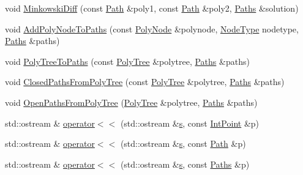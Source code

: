\begin{DoxyCompactItemize}
\item 
void \mbox{\hyperlink{namespace_clipper_lib_a76dac24102863220c7bc13be222a1dda}{Minkowski\+Diff}} (const \mbox{\hyperlink{namespace_clipper_lib_af39c8fe00f278f18cc8142fef41242da}{Path}} \&poly1, const \mbox{\hyperlink{namespace_clipper_lib_af39c8fe00f278f18cc8142fef41242da}{Path}} \&poly2, \mbox{\hyperlink{namespace_clipper_lib_a4bab1d9e10805fa6f1fd3b78c56efcfe}{Paths}} \&solution)
\item 
void \mbox{\hyperlink{namespace_clipper_lib_a4644758856e780ca359c3e37065397a6}{Add\+Poly\+Node\+To\+Paths}} (const \mbox{\hyperlink{class_clipper_lib_1_1_poly_node}{Poly\+Node}} \&polynode, \mbox{\hyperlink{namespace_clipper_lib_a31e9eef1fdd14cee54118420090b61d3}{Node\+Type}} nodetype, \mbox{\hyperlink{namespace_clipper_lib_a4bab1d9e10805fa6f1fd3b78c56efcfe}{Paths}} \&paths)
\item 
void \mbox{\hyperlink{namespace_clipper_lib_a3713b024b773e4e041f3de4595ff0f77}{Poly\+Tree\+To\+Paths}} (const \mbox{\hyperlink{class_clipper_lib_1_1_poly_tree}{Poly\+Tree}} \&polytree, \mbox{\hyperlink{namespace_clipper_lib_a4bab1d9e10805fa6f1fd3b78c56efcfe}{Paths}} \&paths)
\item 
void \mbox{\hyperlink{namespace_clipper_lib_a83f3a341799f94dd6bd9649b319d85fa}{Closed\+Paths\+From\+Poly\+Tree}} (const \mbox{\hyperlink{class_clipper_lib_1_1_poly_tree}{Poly\+Tree}} \&polytree, \mbox{\hyperlink{namespace_clipper_lib_a4bab1d9e10805fa6f1fd3b78c56efcfe}{Paths}} \&paths)
\item 
void \mbox{\hyperlink{namespace_clipper_lib_aa8b0b36c4c1e8108f39b10e4fba81cc5}{Open\+Paths\+From\+Poly\+Tree}} (\mbox{\hyperlink{class_clipper_lib_1_1_poly_tree}{Poly\+Tree}} \&polytree, \mbox{\hyperlink{namespace_clipper_lib_a4bab1d9e10805fa6f1fd3b78c56efcfe}{Paths}} \&paths)
\item 
std\+::ostream \& \mbox{\hyperlink{namespace_clipper_lib_a2e9613a92f21ac827d5b7f8b5ade5795}{operator$<$$<$}} (std\+::ostream \&\mbox{\hyperlink{detection_8cc_a9090f9756293390c57567a0bf7630abf}{s}}, const \mbox{\hyperlink{struct_clipper_lib_1_1_int_point}{Int\+Point}} \&p)
\item 
std\+::ostream \& \mbox{\hyperlink{namespace_clipper_lib_abd88603a8c170404d069edae2e574fe9}{operator$<$$<$}} (std\+::ostream \&\mbox{\hyperlink{detection_8cc_a9090f9756293390c57567a0bf7630abf}{s}}, const \mbox{\hyperlink{namespace_clipper_lib_af39c8fe00f278f18cc8142fef41242da}{Path}} \&p)
\item 
std\+::ostream \& \mbox{\hyperlink{namespace_clipper_lib_aa8b8872f6e4840cb63769a59a88eab4d}{operator$<$$<$}} (std\+::ostream \&\mbox{\hyperlink{detection_8cc_a9090f9756293390c57567a0bf7630abf}{s}}, const \mbox{\hyperlink{namespace_clipper_lib_a4bab1d9e10805fa6f1fd3b78c56efcfe}{Paths}} \&p)

\end{DoxyCompactItemize}
